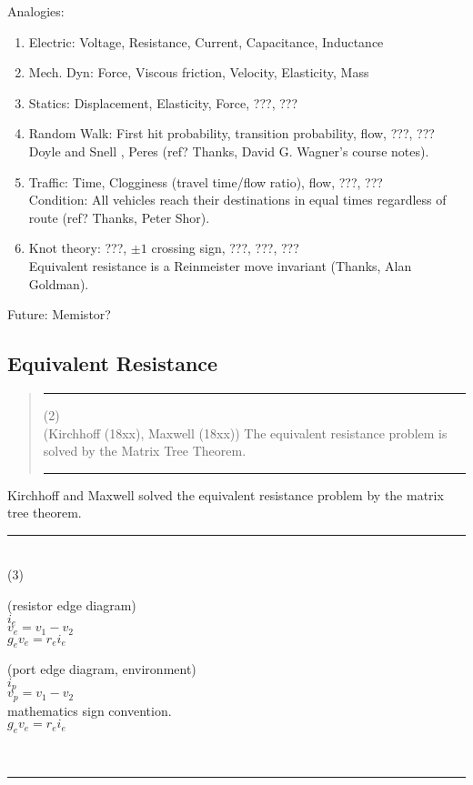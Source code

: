 \documentclass{article}
\begin{document}
Analogies:
\begin{enumerate}
\item Electric: Voltage, Resistance, Current, Capacitance, Inductance
\item Mech. Dyn: Force, Viscous friction, Velocity, Elasticity, Mass
\item Statics: Displacement, Elasticity, Force,  ???, ???
\item Random Walk: First hit probability, transition probability, flow, ???, ??? \\
Doyle and Snell \cite{DoyleSnellRandom},
Peres (ref? Thanks, David G. Wagner's course notes).
\item Traffic: Time, Clogginess (travel time/flow ratio), flow, ???, ???\\
Condition: All vehicles reach their destinations in equal times regardless of 
route (ref? Thanks, Peter Shor).
\item Knot theory: ???, $\pm 1$ crossing sign, ???, ???, ???\\
Equivalent resistance is a Reinmeister move invariant\cite{} (Thanks, Alan Goldman).
\end{enumerate}


Future: Memistor?


\subsection{Equivalent Resistance}




\pagebreak[3] \begin{quote}\rule{\textwidth}{3pt}
(2)\\
(Kirchhoff (18xx), Maxwell (18xx)) The equivalent resistance problem
is solved by
the Matrix Tree Theorem.
 
\rule{\textwidth}{3pt}
\end{quote}


Kirchhoff and Maxwell solved the equivalent resistance problem
by the matrix tree theorem.


\rule{\textwidth}{3pt}\\
(3)\\
\begin{minipage}{.4\textwidth}
(resistor edge diagram)\\
$i_e$\\
$v_e=v_1-v_2$\\
$g_ev_e=r_ei_e$
\end{minipage}
\begin{minipage}{.4\textwidth}
(port edge diagram, environment)\\
$i_p$\\
$v_p=v_1-v_2$\\
mathematics sign convention.\\
$g_ev_e=r_ei_e$
\end{minipage}\\
\rule{\textwidth}{3pt}\\
\end{document}
